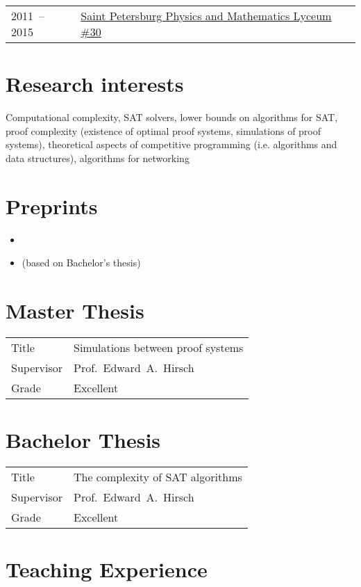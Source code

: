 \documentclass[a4paper, 11pt]{article}
\begin{document}
\begin{tabularx}{\textwidth}{lX}
    2011~-- 2015 & \href{http://www.school30.spb.ru/}{Saint Petersburg Physics and Mathematics Lyceum \#30}
\end{tabularx}


\section*{Research interests}

Computational complexity, SAT solvers, lower bounds on algorithms for SAT, proof complexity (existence of optimal proof systems, simulations of proof systems), theoretical aspects of competitive programming (i.e. algorithms and data structures), algorithms for networking

\section*{Preprints}

\begin{itemize}
    \item {}
    \item {} (based on Bachelor's thesis)
\end{itemize}

\section*{Master Thesis}

\begin{tabularx}{\textwidth}{lX}
    Title & Simulations between proof systems \\
    Supervisor & Prof.~Edward~A.~Hirsch \\
    Grade & Excellent
\end{tabularx}

\section*{Bachelor Thesis}

\begin{tabularx}{\textwidth}{lX}
    Title & The complexity of SAT algorithms \\
    Supervisor & Prof.~Edward~A.~Hirsch \\
    Grade & Excellent
\end{tabularx}

\section*{Teaching Experience}
\end{document}
